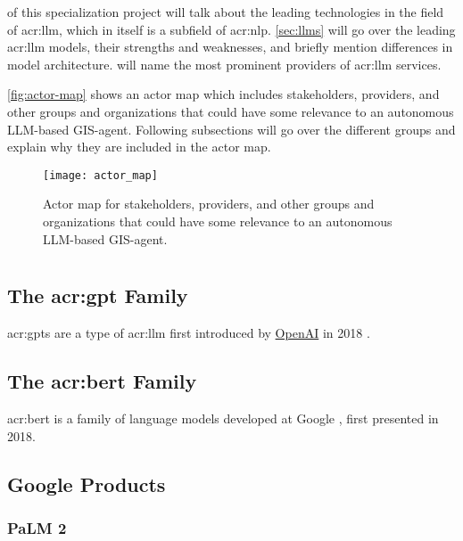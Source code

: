  of this specialization project will talk about the leading technologies in the field of \gls{acr:llm}, which in itself is a subfield of \gls{acr:nlp}. \autoref{sec:llms} will go over the leading \gls{acr:llm} models, their strengths and weaknesses, and briefly mention differences in model architecture.  will name the most prominent providers of \gls{acr:llm} services.

\autoref{fig:actor-map} shows an actor map which includes stakeholders, providers, and other groups and organizations that could have some relevance to an autonomous LLM-based GIS-agent. Following subsections will go over the different groups and explain why they are included in the actor map.

\begin{figure}
    \texttt{[image: actor\_map]}
    \caption{Actor map for stakeholders, providers, and other groups and organizations that could have some relevance to an autonomous LLM-based GIS-agent.}
    \label{fig:actor-map}
\end{figure}

\section[Large Language Models]{}\label{sec:llms}

\subsection[The GPT Family]{The \acrshort{acr:gpt} Family}

\glspl{acr:gpt} are a type of \gls{acr:llm} first introduced by \hyperref[subsec:openai]{OpenAI} in 2018 \citep{radfordImprovingLanguageUnderstanding2018}.

\subsection[The BERT Family]{The \acrshort{acr:bert} Family}

\gls{acr:bert} is a family of language models developed at Google \citep{devlinBERTPretrainingDeep2019}, first presented in 2018.

\subsection{Google Products}

\subsubsection{PaLM 2}

